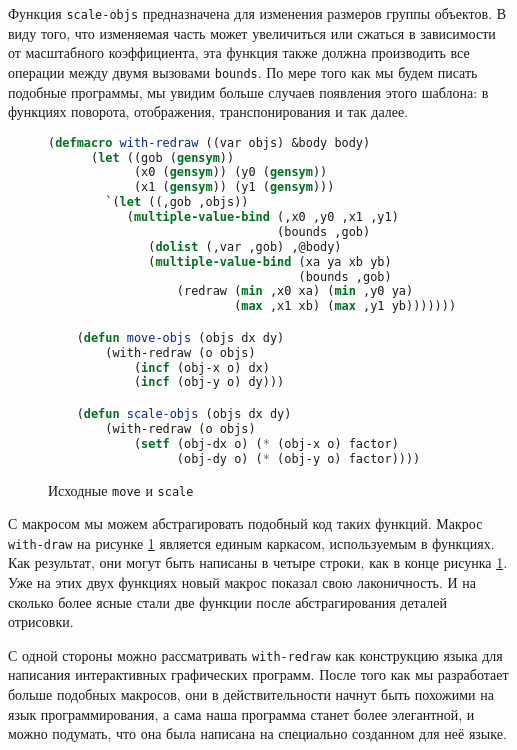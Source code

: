 \documentclass[12pt, a4paper]{article} %
\begin{document}
Функция \texttt{scale-objs} предназначена для изменения размеров группы объектов. В виду того, что изменяемая часть может увеличиться или сжаться в зависимости от масштабного коэффициента, эта функция также должна производить все операции между двумя вызовами \texttt{bounds}. По мере того как мы будем писать подобные программы, мы увидим больше случаев появления этого шаблона: в функциях поворота, отображения, транспонирования и так далее.
\begin{figure}[h]
\begin{lstlisting}[language=Lisp]
    (defmacro with-redraw ((var objs) &body body)
      (let ((gob (gensym))
            (x0 (gensym)) (y0 (gensym))
            (x1 (gensym)) (y1 (gensym)))
        `(let ((,gob ,objs))
           (multiple-value-bind (,x0 ,y0 ,x1 ,y1) 
                                (bounds ,gob)
              (dolist (,var ,gob) ,@body)
              (multiple-value-bind (xa ya xb yb) 
                                   (bounds ,gob)
                  (redraw (min ,x0 xa) (min ,y0 ya)
                          (max ,x1 xb) (max ,y1 yb)))))))

    (defun move-objs (objs dx dy)
        (with-redraw (o objs)
            (incf (obj-x o) dx)
            (incf (obj-y o) dy)))

    (defun scale-objs (objs dx dy)
        (with-redraw (o objs)
            (setf (obj-dx o) (* (obj-x o) factor)
                  (obj-dy o) (* (obj-y o) factor))))
\end{lstlisting}
\caption{Исходные \texttt{move} и \texttt{scale}}
\label{fig:8-filleted-move-scale}
\end{figure}

С макросом мы можем абстрагировать подобный код таких функций. Макрос \texttt{with-draw} на рисунке \ref{fig:8-filleted-move-scale} является единым каркасом, используемым в функциях. Как результат, они могут быть написаны в четыре строки, как в конце рисунка \ref{fig:8-filleted-move-scale}. Уже на этих двух функциях новый макрос показал свою лаконичность. И на сколько более ясные стали две функции после абстрагирования деталей отрисовки.

С одной стороны можно рассматривать \texttt{with-redraw} как конструкцию языка для написания интерактивных графических программ. После того как мы разработает больше подобных макросов, они в действительности начнут быть похожими на язык программирования, а сама наша программа станет более  элегантной, и можно подумать, что она была написана на специально созданном для неё языке.
\end{document}
